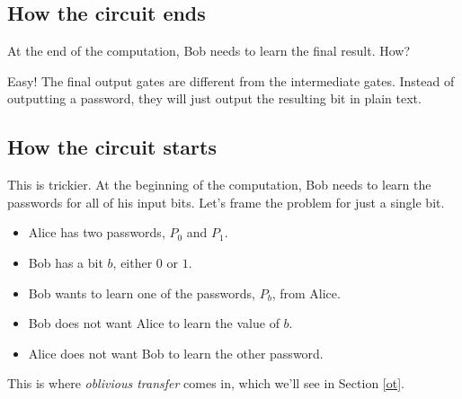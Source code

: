 \subsection{How the circuit ends}

At the end of the computation, Bob needs to learn the final result. How?

Easy! The final output gates are different from the intermediate gates.
Instead of outputting a password, they will just output the resulting
bit in plain text.

\subsection{How the circuit starts}

This is trickier. At the beginning of the computation, Bob needs to
learn the passwords for all of his input bits. Let's frame the problem
for just a single bit.

\begin{itemize}
\item
  Alice has two passwords, $P_{0}$ and $P_{1}$.
\item
  Bob has a bit $b$, either $0$ or $1$.
\item
  Bob wants to learn one of the passwords, $P_{b}$, from Alice.
\item
  Bob does not want Alice to learn the value of $b$.
\item
  Alice does not want Bob to learn the other password.
\end{itemize}

This is where \emph{oblivious transfer} comes in, which we'll see in
Section \ref{ot}.

